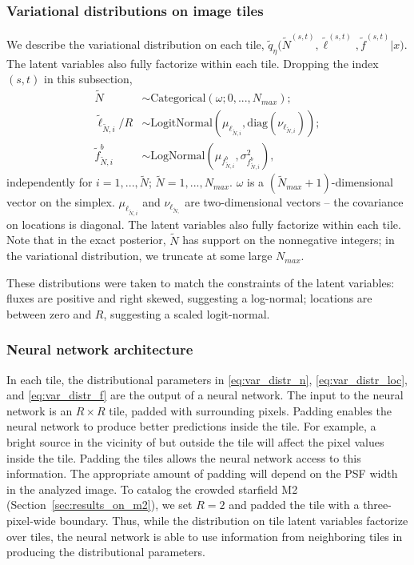 \subsubsection{Variational distributions on image tiles}
\label{sec:distr_on_tiles}
We describe the variational distribution on each tile,
$\tilde q_\eta\big(\tilde N^{(s, t)}, \tilde \ell^{(s, t)}, \tilde f^{(s, t)} | x\big)$.
The latent variables also fully factorize within each tile. 
Dropping the index 
$(s,t)$ in this subsection, 
\begin{align}
    \tilde N &\sim \text{Categorical}(
    \omega; 0, ..., N_{max});  \label{eq:var_distr_n}\\
	\tilde \ell_{\tilde N, i} / R &\sim \text{LogitNormal}(\mu_{\ell_{\tilde N, i}}, \text{diag}(\nu_{\ell_{\tilde N, i}}) )\label{eq:var_distr_loc}; \\
	\tilde f^b_{\tilde N, i} &\sim \text{LogNormal}(\mu_{f^b_{\tilde N, i}}, \sigma^2_{f^b_{\tilde N, i}}), \label{eq:var_distr_f}
\end{align}
independently for $i = 1, ..., \tilde N$; $\tilde{N} = 1, ..., N_{max}$. 
$\omega$ is a $(\tilde N_{max} + 1)$-dimensional vector on the simplex. $\mu_{\ell_{\tilde N, i}}$ and $\nu_{\ell_{\tilde N, }}$ are two-dimensional vectors -- the covariance on locations is diagonal. 
The latent variables also fully factorize within each tile. Note that in the exact posterior, $\tilde N$ has support on the nonnegative integers; in the variational distribution, we truncate at some large $N_{max}$. 


These distributions were taken to match the constraints of the latent variables: fluxes are positive and right skewed, suggesting a log-normal; locations are between zero and $R$, suggesting a scaled logit-normal. 

\subsubsection{Neural network architecture}
\label{sec:nn_archetecture}

In each tile, the distributional parameters in \eqref{eq:var_distr_n},
\eqref{eq:var_distr_loc}, and \eqref{eq:var_distr_f} are the output of a neural network. 
The input to the neural network is an $R \times R$ tile, padded with surrounding pixels.
Padding enables the neural network to produce better predictions inside the tile. 
For example, a bright source in the vicinity of but outside the tile will affect the pixel values inside the tile. 
Padding the tiles allows the neural network access to this information. 
The appropriate amount of padding will depend on the PSF width in the analyzed image. 
To catalog the crowded starfield M2 (Section~\ref{sec:results_on_m2}),
we set $R = 2$ and padded the tile with a three-pixel-wide boundary.
Thus, while the distribution on tile latent variables factorize over tiles, the neural network is able to use information from neighboring tiles in producing the distributional parameters. 


